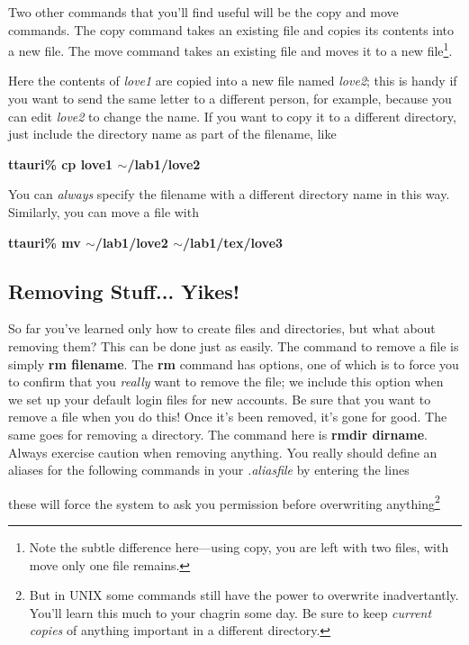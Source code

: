 	Two other commands that you'll find useful will be the copy and
move commands.  The copy command takes an existing file and copies its
contents into a new file.  The move command takes an existing file and
moves it to a new file\footnote{Note the subtle difference here---using
copy, you are left with two files, with move only one file remains.}. 


\noindent Here the contents of {\it love1} are copied into a new file
named {\it love2}; this is handy if you want to send the same letter to
a different person, for example, because you can edit {\it love2} to
change the name.  If you want to copy it to a different directory, just
include the directory name as part of the filename, like

\noindent \textbf {ttauri\% cp love1 $\sim$/lab1/love2}

\noindent You can {\it always} specify the filename with a different
directory name in this way. Similarly, you can move a file with

\noindent \textbf {ttauri\% mv $\sim$/lab1/love2 $\sim$/lab1/tex/love3}

\subsection{Removing Stuff... Yikes!}\label{remove}

	So far you've learned only how to create files and directories,
but what about removing them? This can be done just as easily.  The
command to remove a file is simply {\bf rm filename}.  The {\bf rm}
command has options, one of which is to force you to confirm that you
{\it really} want to remove the file; we include this option when we set
up your default login files for new accounts.  Be sure that you want to
remove a file when you do this! Once it's been removed, it's gone for
good.  The same goes for removing a directory.  The command here is {\bf
rmdir dirname}.  Always exercise caution when removing anything. You
really should define an aliases for the following commands 
in your {\it .aliasfile} by
entering the lines




\noindent these will force the system to ask you permission before
overwriting anything\footnote{But in UNIX some commands still have the
power to overwrite inadvertantly.  You'll learn this much to your
chagrin some day.  Be sure to keep {\it current copies} of anything
important in a different directory.}
	
